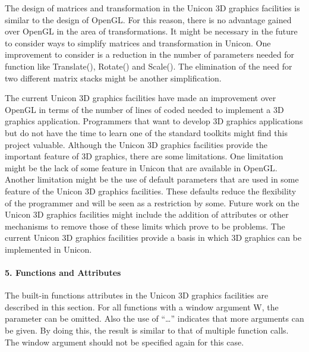 \documentclass[letterpaper]{article}
\begin{document}
{
The design of matrices and transformation in the Unicon 3D graphics facilities is similar to the design of OpenGL. For
this reason, there is no advantage gained over OpenGL in the area of transformations. It might be necessary in the
future to consider ways to simplify matrices and transformation in Unicon. One improvement to consider is a reduction
in the number of parameters needed for function like \textsf{Translate()}, \textsf{Rotate()} and \textsf{Scale()}. The
elimination of the need for two different matrix stacks might be another simplification. }

{
The current Unicon 3D graphics facilities have made an improvement over OpenGL in terms of the number of lines of coded
needed to implement a 3D graphics application. Programmers that want to develop 3D graphics applications but do not
have the time to learn one of the standard toolkits might find this project valuable. Although the Unicon 3D graphics
facilities provide the important feature of 3D graphics, there are some limitations. One limitation might be the lack
of some feature in Unicon that are available in OpenGL. Another limitation might be the use of default parameters that
are used in some feature of the Unicon 3D graphics facilities. These defaults reduce the flexibility of the programmer
and will be seen as a restriction by some. Future work on the Unicon 3D graphics facilities might include the addition
of attributes or other mechanisms to remove those of these limits which prove to be problems. The current Unicon 3D
graphics facilities provide a basis in which 3D graphics can be implemented in Unicon. }


\bigskip

\paragraph[5. Functions and Attributes]{\bfseries 5. Functions and Attributes}

\bigskip

{
The built-in functions attributes in the Unicon 3D graphics facilities are described in this section. For all functions
with a window argument W, the parameter can be omitted. Also the use of ``{\dots}'' indicates that more arguments can
be given. By doing this, the result is similar to that of multiple function calls. The window argument should not be
specified again for this case.}


\bigskip
\end{document}
